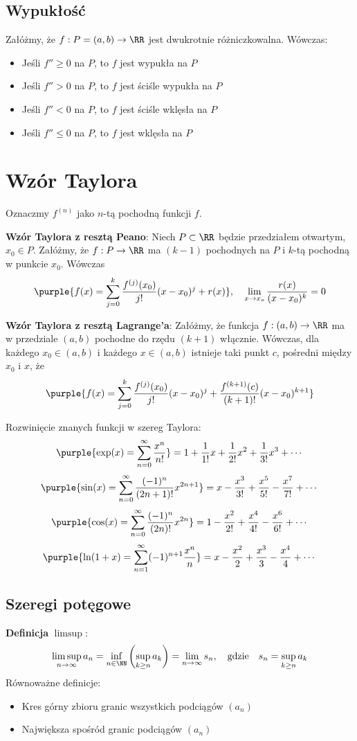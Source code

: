 \subsection{Wypukłość}
Załóżmy, że $f:P=(a,b)\to\RR$ jest dwukrotnie różniczkowalna. Wówczas:
\begin{itemize}
    \item Jeśli $f''\geq0$ na $P$, to $f$ jest wypukła na $P$
    \item Jeśli $f''>0$ na $P$, to $f$ jest ściśle wypukła na $P$
    \item Jeśli $f''<0$ na $P$, to $f$ jest ściśle wklęsła na $P$
    \item Jeśli $f''\leq0$ na $P$, to $f$ jest wklęsła na $P$
\end{itemize}

\section{Wzór Taylora}
Oznaczmy $f^{(n)}$ jako $n$-tą pochodną funkcji $f$.

\textbf{Wzór Taylora z resztą Peano}:
Niech $P\subset\RR$ będzie przedziałem otwartym, $x_0\in P$. Załóżmy, że $f:P\to\RR$ ma $(k-1)$ pochodnych na $P$ i $k$-tą pochodną w punkcie $x_0$. Wówczas
$$\purple{f(x)=\sum_{j=0}^k\frac{f^{(j)}(x_0)}{j!}(x-x_0)^j+r(x)},\quad\lim_{x\to x_o}\frac{r(x)}{(x-x_0)^k}=0$$

\textbf{Wzór Taylora z resztą Lagrange'a}:
Załóżmy, że funkcja $f:(a,b)\to\RR$ ma w przedziale $(a,b)$ pochodne do rzędu $(k+1)$ włącznie. Wówczas, dla każdego $x_0\in(a,b)$ i każdego $x\in(a,b)$ istnieje taki punkt $c$, pośredni między $x_0$ i $x$, że
$$\purple{f(x)=\sum_{j=0}^k\frac{f^{(j)}(x_0)}{j!}(x-x_0)^j + \frac{f^{(k+1)}(c)}{(k+1)!}(x-x_0)^{k+1}}$$

\begin{example}
    Rozwinięcie znanych funkcji w szereg Taylora:
    $$\purple{\exp(x)=\sum_{n=0}^\infty\frac{x^n}{n!}} = 1+\frac{1}{1!}x+\frac{1}{2!}x^2+\frac{1}{3!}x^3+\cdots$$
    $$\purple{\sin(x)=\sum_{n=0}^\infty\frac{(-1)^n}{(2n+1)!}x^{2n+1}} = x-\frac{x^3}{3!}+\frac{x^5}{5!}-\frac{x^7}{7!}+\cdots$$
    $$\purple{\cos(x)=\sum_{n=0}^\infty\frac{(-1)^n}{(2n)!}x^{2n}} = 1-\frac{x^2}{2!}+\frac{x^4}{4!}-\frac{x^6}{6!}+\cdots$$
    $$\purple{\ln(1+x)=\sum_{n=1}^\infty(-1)^{n+1}\frac{x^n}{n}} = x-\frac{x^2}{2}+\frac{x^3}{3}-\frac{x^4}{4}+\cdots$$
\end{example}

\subsection{Szeregi potęgowe}
\textbf{Definicja} $\limsup$:
$$\limsup_{n\to\infty}a_n = \inf_{n\in\NN}\left(\sup_{k\geq n}a_k\right) = \lim_{n\to\infty}s_n, \quad\text{gdzie}\quad s_n = \sup_{k\geq n}a_k$$
Równoważne definicje:
\begin{itemize}
    \item Kres górny zbioru granic wszystkich podciągów $(a_n)$
    \item Największa spośród granic podciągów $(a_n)$
\end{itemize}

